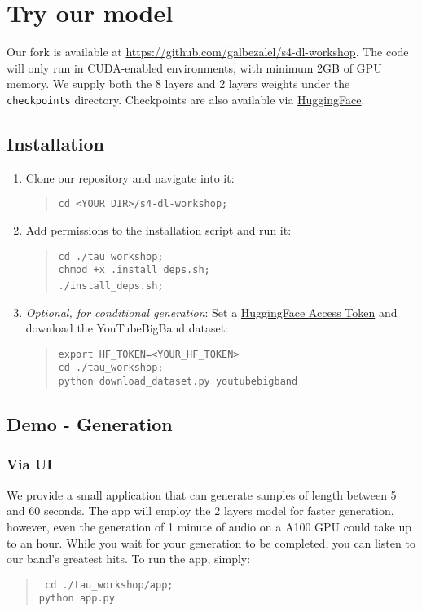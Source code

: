 \documentclass[12pt]{article}
\begin{document}
\section{Try our model}
Our fork is available at \href{https://github.com/galbezalel/s4-dl-workshop}{https://github.com/galbezalel/s4-dl-workshop}. The code will only run in CUDA-enabled environments, with minimum 2GB of GPU memory. 
We supply both the 8 layers and 2 layers weights under the \texttt{checkpoints} directory. Checkpoints are also available via \href{https://huggingface.co/galbezalel/sashimi-bigband}{HuggingFace}.
\subsection{Installation}
\begin{enumerate}
    \item Clone our repository and navigate into it: 
    \begin{quote}
        \texttt{cd <YOUR\_DIR>/s4-dl-workshop;}
    \end{quote}
    \item Add permissions to the installation script and run it: 
    \begin{quote}
        \texttt{cd ./tau\_workshop;}\\
        \texttt{chmod +x .install\_deps.sh;}\\
        \texttt{./install\_deps.sh;}\
    \end{quote}
    \item \textit{Optional, for conditional generation}: Set a \href{https://huggingface.co/docs/hub/en/security-tokens}{HuggingFace Access Token} and download the YouTubeBigBand dataset:
    \begin{quote}
        \texttt{export HF\_TOKEN=<YOUR\_HF\_TOKEN>}\\
        \texttt{cd ./tau\_workshop;}\\
        \texttt{python download\_dataset.py youtubebigband}\\
    \end{quote}
\end{enumerate}
\subsection{Demo - Generation}
\subsubsection{Via UI}
We provide a small application that can generate samples of length between 5 and 60 seconds. The app will employ the 2 layers model for faster generation, however, even the generation of 1 minute of audio on a A100 GPU could take up to an hour. While you wait for your generation to be completed, you can listen to our band's greatest hits.
To run the app, simply:
\begin{quote}
    \texttt{
        \texttt{cd ./tau\_workshop/app;}\\
        \texttt{python app.py}\\
    }
\end{quote}
\end{document}
